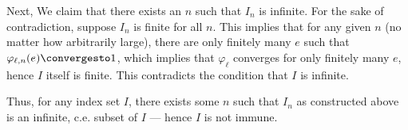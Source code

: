 \begin{problem}
\begin{answer}
\begin{enumarabic}
        \step
        Next, We claim that there exists an $n$ such that
        $I_n$ is infinite.
        For the sake of contradiction, suppose $I_n$ is finite for all $n$.
        This implies that for any given $n$ (no matter how arbitrarily
        large), there are only finitely many $e$ such that
        $\varphi_{\ell,n}(e) \convergesto 1$, which implies that
        $\varphi_{\ell}$ converges for only finitely many $e$,
        hence $I$ itself is finite.
        This contradicts the condition that $I$ is infinite.

        \step
        Thus, for any index set $I$, there exists some $n$ such that
        $I_n$ as constructed above is an infinite, c.e. subset
        of $I$ --- hence $I$ is not immune.
    \end{enumarabic}
  \end{answer}
\end{problem}
